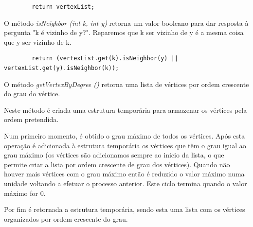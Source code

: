 \documentclass[a4paper,10pt]{report}
\begin{document}
\begin{lstlisting}
        return vertexList;
\end{lstlisting}

O método \textit{isNeighbor (int k, int y)} retorna um valor booleano para dar resposta à pergunta "k é vizinho de y?". Reparemos que k ser vizinho de y é a mesma coisa que y ser vizinho de k.

\begin{lstlisting}
        return (vertexList.get(k).isNeighbor(y) || vertexList.get(y).isNeighbor(k));
\end{lstlisting}

O método \textit{getVertexByDegree ()} retorna uma lista de vértices por ordem crescente do grau do vértice.

Neste método é criada uma estrutura temporária para armazenar os vértices pela ordem pretendida.

Num primeiro momento, é obtido o grau máximo de todos os vértices. Após esta operação é adicionada à estrutura temporária os vértices que têm o grau igual ao grau máximo (os vértices são adicionamos sempre ao inicio da lista, o que permite criar a lista por ordem crescente de grau dos vértices). Quando não houver mais vértices com o grau máximo então é reduzido o valor máximo numa unidade voltando a efetuar o processo anterior. Este ciclo termina quando o valor máximo for 0.

Por fim é retornada a estrutura temporária, sendo esta uma lista com os vértices organizados por ordem crescente do grau.
\end{document}
